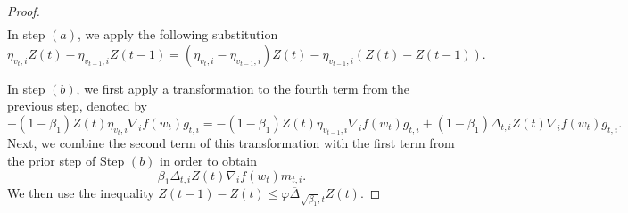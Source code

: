 \documentclass{article} %
\begin{document}
\begin{proof}
\begin{align*}
\end{align*}
In step \((a)\), we apply the following substitution
$$\eta_{v_{t},i}Z(t)-\eta_{v_{t-1},i}Z(t-1)=(\eta_{v_{t},i}-\eta_{v_{t-1},i})Z(t)-\eta_{v_{t-1},i}(Z(t)-Z(t-1)).$$ 

In step \((b)\), we first apply a transformation to the fourth term from the previous step, denoted by 
\[-(1-\beta_{1})Z(t)\eta_{v_{t},i}\nabla_{i}f(w_{t})g_{t,i}=-(1-\beta_{1})Z(t)\eta_{v_{t-1},i}\nabla_{i}f(w_{t})g_{t,i}+(1-\beta_{1})\Delta_{t,i}Z(t)\nabla_{i}f(w_{t})g_{t,i}.\]
Next, we combine the second term of this transformation with the first term from the prior step of Step $(b)$ in order to obtain 
\[\beta_{1}\Delta_{t,i}Z(t)\nabla_{i}f(w_{t})m_{t,i}.\]
We then use the inequality \(Z(t-1) - Z(t)\le \varphi\overline{\Delta}_{\sqrt{\beta_{1}},t}Z(t).\)


\end{proof}
\end{document}
